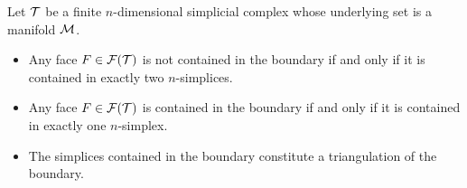 \documentclass[10pt,letterpaper]{article}
\newcommand\cye[1]{%
  \protect\leavevmode
  \begingroup
    \color{red!35!yellow}%
    #1%
  \endgroup
}
\begin{document}
\begin{lemma}\label{lemma:boundarysimplices}
    Let ${\mathcal T}$ be a finite $n$-dimensional simplicial complex whose underlying \cye{set} is a manifold ${\mathcal M}$. 
    \begin{itemize}
        \item Any face $F \in {\mathcal F}({\mathcal T})$ is not contained in the boundary if and only if it is contained in exactly two $n$-simplices.
        \item Any face $F \in {\mathcal F}({\mathcal T})$ is contained in the boundary if and only if it is contained in exactly one $n$-simplex.
        \item The simplices contained in the boundary constitute a triangulation of the boundary.
    \end{itemize}
\end{lemma}
\end{document}
